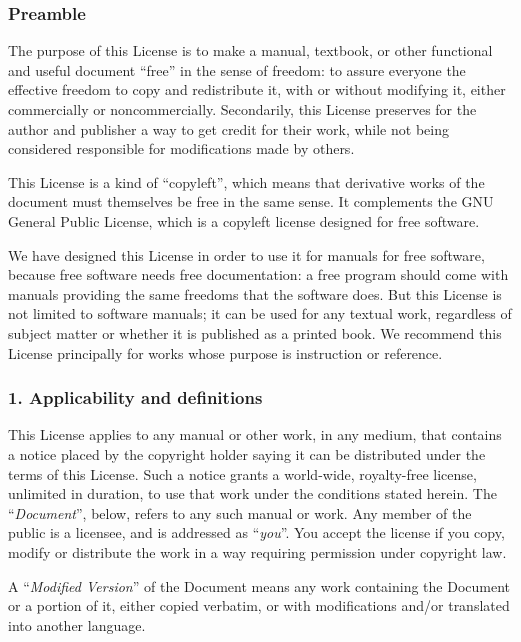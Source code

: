 \documentclass[a4paper,openany]{book}
\begin{document}
\begin{results}
\tiny

\subsubsection*{Preamble}

The purpose of this License is to make a manual, textbook, or other
functional and useful document ``free'' in the sense of freedom: to
assure everyone the effective freedom to copy and redistribute it,
with or without modifying it, either commercially or noncommercially.
Secondarily, this License preserves for the author and publisher a way
to get credit for their work, while not being considered responsible
for modifications made by others.

This License is a kind of ``copyleft'', which means that derivative
works of the document must themselves be free in the same sense. It
complements the GNU General Public License, which is a copyleft
license designed for free software.

We have designed this License in order to use it for manuals for free
software, because free software needs free documentation: a free
program should come with manuals providing the same freedoms that the
software does. But this License is not limited to software manuals;
it can be used for any textual work, regardless of subject matter or
whether it is published as a printed book. We recommend this License
principally for works whose purpose is instruction or reference.

\subsubsection*{1. Applicability and definitions}

This License applies to any manual or other work, in any medium, that
contains a notice placed by the copyright holder saying it can be
distributed under the terms of this License. Such a notice grants a
world-wide, royalty-free license, unlimited in duration, to use that
work under the conditions stated herein. The ``\emph{Document}'', below,
refers to any such manual or work. Any member of the public is a
licensee, and is addressed as ``\emph{you}''. You accept the license if you
copy, modify or distribute the work in a way requiring permission
under copyright law.

A ``\emph{Modified Version}'' of the Document means any work containing the
Document or a portion of it, either copied verbatim, or with
modifications and/or translated into another language.


\end{results}
\end{document}

